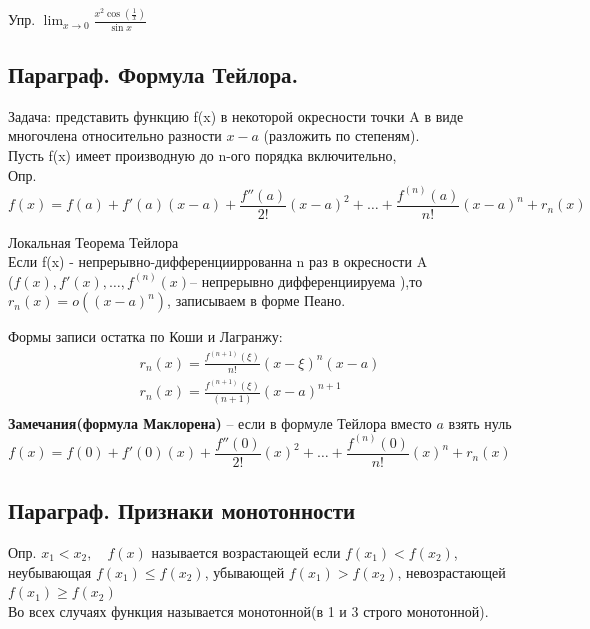\documentclass[a4paper, 12pt]{article}
\begin{document}
Упр. $ \lim_{x\to 0} \frac{x^2 \cos(\frac{1}{x})}{\sin x} $

\newpage
\subsection{Параграф. Формула Тейлора.}
Задача: представить функцию f(x) в некоторой окресности точки A в виде многочлена относительно разности $ x - a $ (разложить по степеням).\\

Пусть f(x) имеет производную до n-ого порядка включительно,\\
Опр.
\[
    f(x) = f(a) + f'(a)(x-a) + \frac{f''(a)}{2!}(x-a)^2 + \ldots + \frac{f^{(n)}(a)}{n!}(x-a)^n + r_n(x)
  \]  

\begin{mdframed}[backgroundcolor=blue!20] 
       Локальная Теорема Тейлора\\
       Если f(x) - непрерывно-дифференцииррованна n раз в окресности A\\($ f(x),f'(x),\ldots,f^{(n)}(x) $-- непрерывно дифференциируема ),то $ r_n(x) = o((x-a)^n) $, записываем в форме Пеано.\\
    \end{mdframed}
    
Формы записи остатка по Коши и Лагранжу:\\
\begin{align*}
   r_n(x) = \frac{f^{(n+1)}(\xi)}{n!}(x-\xi)^n(x-a) \\
   r_n(x) = \frac{f^{(n+1)}(\xi)}{(n+1)}(x-a)^{n+1}\\
 \end{align*}
\textbf{Замечания(формула Маклорена)} -- если в формуле Тейлора вместо $ a $ взять нуль\\
\[
   f(x) = f(0) + f'(0)(x) + \frac{f''(0)}{2!}(x)^2 + \ldots + \frac{f^{(n)}(0)}{n!}(x)^n + r_n(x)
\] 

\subsection{Параграф. Признаки монотонности}

Опр. $ x_1 < x_2, \quad f(x) $ называется возрастающей если $ f(x_1)< f(x_2) $, неубывающая $ f(x_1) \leq f(x_2) $, убывающей $ f(x_1) > f(x_2) $, невозрастающей $ f(x_1) \geq f(x_2) $ \\
Во всех случаях функция называется монотонной(в 1 и 3 строго монотонной).\\  
\end{document}
